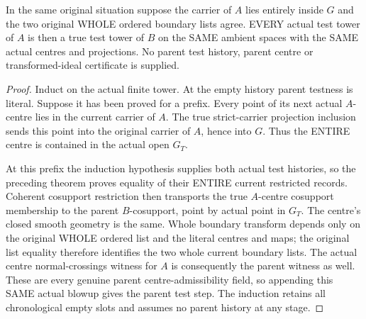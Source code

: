\begin{theorem}
\label{hir:original-open-carrier-test-history-extension}
\leanok
In the same original situation suppose the carrier of $A$ lies entirely
inside $G$ and the two original WHOLE ordered boundary lists agree.
EVERY actual test tower of $A$ is then a true test tower of $B$ on the SAME
ambient spaces with the SAME actual centres and projections. No parent test
history, parent centre or transformed-ideal certificate is supplied.
\end{theorem}
\begin{proof}
Induct on the actual finite tower. At the empty history parent testness is
literal. Suppose it has been proved for a prefix. Every point of its next
actual $A$-centre lies in the current carrier of $A$. The true strict-carrier
projection inclusion sends this point into the original carrier of $A$,
hence into $G$. Thus the ENTIRE centre is contained in the actual open $G_T$.

At this prefix the induction hypothesis supplies both actual test histories,
so the preceding theorem proves equality of their ENTIRE current restricted
records. Coherent cosupport restriction then transports the true $A$-centre
cosupport membership to the parent $B$-cosupport, point by actual point in
$G_T$. The centre's closed smooth geometry is the same. Whole boundary
transform depends only on the original WHOLE ordered list and the literal
centres and maps; the original list equality therefore identifies the two
whole current boundary lists. The actual centre normal-crossings witness
for $A$ is consequently the parent witness as well. These are every genuine
parent centre-admissibility field, so appending this SAME actual blowup gives
the parent test step. The induction retains all chronological empty slots
and assumes no parent history at any stage.
\end{proof}
